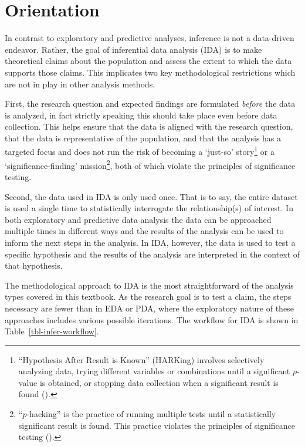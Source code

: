 \documentclass[
  letterpaper,
  krantz1]{latex/krantz-mod}
\theoremstyle{definition}
\theoremstyle{definition}
\theoremstyle{remark}
\begin{document}
\section{Orientation}\label{sec-infer-orientation}

In contrast to exploratory and predictive analyses, inference is not a
data-driven endeavor. Rather, the goal of inferential data analysis
(IDA) is to make theoretical
claims about the population and assess the extent to which the data
supports those claims. This implicates two
key methodological restrictions which are not in play in other analysis
methods.

First, the research question and expected
findings are formulated \emph{before} the data is analyzed, in fact
strictly speaking this should take place even before data
collection. This helps ensure that the data is
aligned with the research question, that the data is
representative of the
population, and that the analysis has a targeted focus
and does not run the risk of becoming a `just-so' story\footnote{``Hypothesis
  After Result is Known'' (HARKing) involves selectively analyzing data,
  trying different variables or combinations until a significant
  \(p\)-value is obtained, or stopping data collection when a
  significant result is found ().} or
a `significance-finding' mission\footnote{``\(p\)-hacking'' is the
  practice of running multiple tests until a statistically significant
  result is found. This practice violates the principles of significance
  testing ().}, both of which violate the principles of
significance testing.

Second, the data used in IDA is only used once. That is to say, the
entire dataset is used a single time to statistically interrogate the
relationship(s) of interest. In both
exploratory and predictive data
analysis the data can be
approached multiple times in different ways and the results of the
analysis can be used to inform the next steps in the analysis. In IDA,
however, the data is used to test a specific
hypothesis and the results of the analysis are
interpreted in the context of that
hypothesis.

The methodological approach to
IDA is the most straightforward
of the analysis types covered in this textbook. As the research goal is
to test a claim, the steps necessary are fewer than in EDA or PDA, where
the exploratory nature of these approaches includes various possible
iterations. The workflow for IDA is shown in
Table~\ref{tbl-infer-workflow}.
\end{document}
